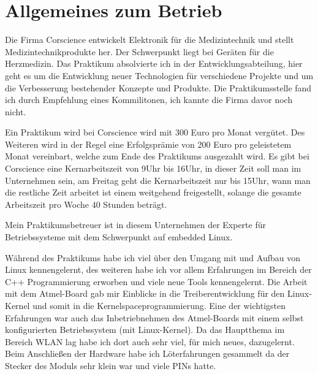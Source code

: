 \documentclass[pdftex,12pt,a4paper]{scrartcl}
\begin{document}

\tableofcontents
\section{Allgemeines zum Betrieb}
Die Firma Corscience entwickelt Elektronik für die Medizintechnik und stellt Medizintechnikprodukte her.
Der Schwerpunkt liegt bei Geräten für die Herzmedizin.
Das Praktikum absolvierte ich in der Entwicklungsabteilung, hier geht es um die Entwicklung neuer Technologien für verschiedene Projekte und um die Verbesserung bestehender Konzepte und Produkte.
Die Praktikumsstelle fand ich durch Empfehlung eines Kommilitonen, ich kannte die Firma davor noch nicht.

Ein Praktikum wird bei Corscience wird mit 300 Euro pro Monat vergütet. Des Weiteren wird in der Regel eine Erfolgsprämie von 200 Euro pro geleistetem Monat vereinbart, welche zum Ende des Praktikums ausgezahlt wird.
Es gibt bei Corscience eine Kernarbeitszeit von 9Uhr bis 16Uhr, in dieser Zeit soll man im Unternehmen sein, am Freitag geht die Kernarbeitszeit nur bis 15Uhr, wann man die restliche Zeit arbeitet ist einem weitgehend freigestellt, solange die gesamte Arbeitszeit pro Woche 40 Stunden beträgt.

Mein Praktikumsbetreuer ist in diesem Unternehmen der Experte für Betriebssysteme mit dem Schwerpunkt auf embedded Linux.

Während des Praktikums habe ich viel über den Umgang mit und Aufbau von Linux kennengelernt, des weiteren habe ich vor allem Erfahrungen im Bereich der C++ Programmierung erworben und viele neue Tools kennengelernt. Die Arbeit mit dem Atmel-Board gab mir Einblicke in die Treiberentwicklung für den Linux-Kernel und somit in die Kernelspaceprogrammierung. Eine der wichtigsten Erfahrungen war auch das Inbetriebnehmen des Atmel-Boards mit einem selbst konfigurierten Betriebssystem (mit Linux-Kernel). Da das Hauptthema im Bereich WLAN lag habe ich dort auch sehr viel, für mich neues, dazugelernt. Beim Anschließen der Hardware habe ich Löterfahrungen gesammelt da der Stecker des Moduls sehr klein war und viele PINs hatte.
\end{document}
